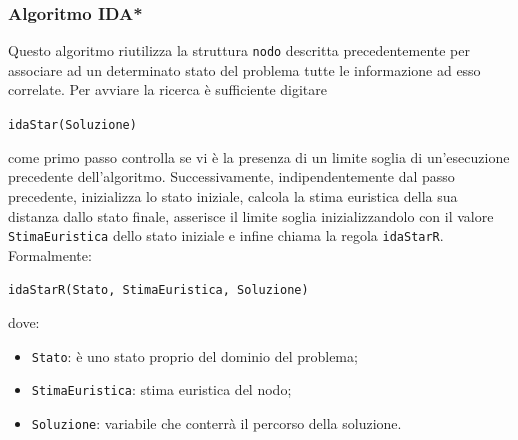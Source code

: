 \documentclass[a4paper,oneside,12pt]{book}
\def \code#1{\texttt{#1}}
\begin{document}
	\subsubsection{Algoritmo IDA*}
	Questo algoritmo riutilizza la struttura \code{nodo} descritta precedentemente per associare ad un determinato stato del problema tutte le informazione ad esso correlate.
	Per avviare la ricerca è sufficiente digitare
	\begin{center}
		\code{idaStar(Soluzione)}
	\end{center}
	come primo passo controlla se vi è la presenza di un limite soglia di un'esecuzione precedente dell'algoritmo. Successivamente, indipendentemente dal passo precedente, inizializza lo stato iniziale, calcola la stima euristica della sua distanza dallo stato finale, asserisce il limite soglia inizializzandolo con il valore \code{StimaEuristica} dello stato iniziale e infine chiama la regola \code{idaStarR}.
	Formalmente:
	\begin{center}
		\code{idaStarR(Stato, StimaEuristica, Soluzione)}
	\end{center}
	dove:
	\begin{itemize}
		\item \code{Stato}: è uno stato proprio del dominio del problema;
		\item \code{StimaEuristica}: stima euristica del nodo;
		\item \code{Soluzione}: variabile che conterrà il percorso della soluzione.
	\end{itemize}
\end{document}
